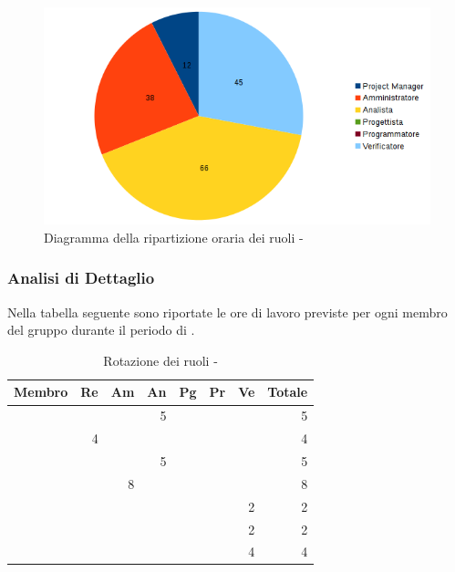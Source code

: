 \documentclass[12pt,a4paper]{article}
\begin{document}
\begin{center}
	\begin{figure}[H]
		\centering
		\includegraphics[width=\textwidth]{../img/diagrammaTortaAnalisiTotaleOre.png}
		\caption{Diagramma della ripartizione oraria dei ruoli - \FA{}}
	\end{figure}
\end{center}

\newpage
\subsubsection{Analisi di Dettaglio}

Nella tabella seguente sono riportate le ore di lavoro previste per ogni membro del gruppo durante il periodo di \FAD{}.

\begin{table}[H]
	\begin{center}
		\begin{tabular}{l r r r r r r r}
			\toprule
			\textbf{Membro}	&	\textbf{Re}	&	\textbf{Am}	& \textbf{An} & \textbf{Pg} & \textbf{Pr} & \textbf{Ve} & \textbf{Totale}\\
			\midrule
			\midrule
			\IB{} & & & 5 & & & & 5 \\
			\midrule
			\AB{} & 4 & & & & & & 4 \\
			\midrule
			\NDC{} & & & 5 & & & & 5 \\
			\midrule
			\TP{} & & 8 & & & & & 8 \\
			\midrule
			\WS{} & & & & & & 2 & 2 \\
			\midrule
			\AVE{} & & & & & & 2 & 2 \\
			\midrule
			\AVI{} & & & & & & 4 & 4 \\
			\bottomrule
		\end{tabular}
		\caption{Rotazione dei ruoli - \FAD{}}
	\end{center}
\end{table}
\end{document}
